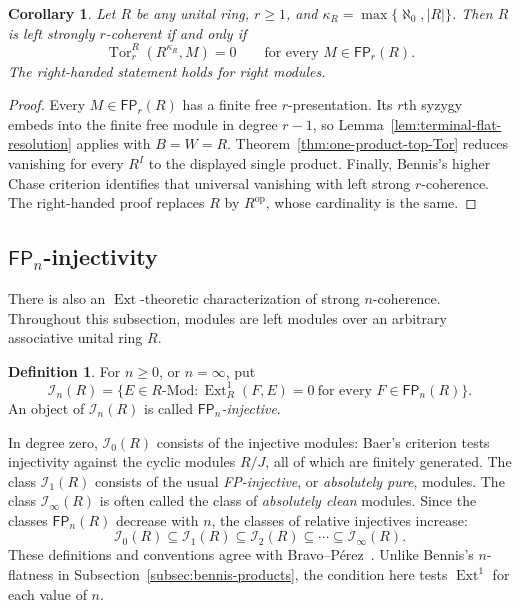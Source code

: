 \documentclass[11pt]{article}
\numberwithin{equation}{section}
\newtheorem{corollary}[theorem]{Corollary}
\theoremstyle{definition}
\newtheorem{definition}[theorem]{Definition}
\theoremstyle{remark}
\newcommand{\Tor}{\operatorname{Tor}}
\newcommand{\Ext}{\operatorname{Ext}}
\newcommand{\FP}{\mathsf{FP}}
\begin{document}
\begin{corollary}
\label{cor:one-product-Chase}
Let $R$ be any unital ring, $r\ge1$, and
$\kappa_R=\max\{\aleph_0,|R|\}$.  Then $R$ is left strongly
$r$-coherent if and only if
\[
\Tor_r^R(R^{\kappa_R},M)=0
\qquad\text{for every }M\in\FP_r(R).
\]
The right-handed statement holds for right modules.
\end{corollary}
\begin{proof}
Every $M\in\FP_r(R)$ has a finite free $r$-presentation.  Its
$r$th syzygy embeds into the finite free module in degree $r-1$, so
Lemma~\ref{lem:terminal-flat-resolution} applies with $B=W=R$.
Theorem~\ref{thm:one-product-top-Tor} reduces vanishing for every
$R^I$ to the displayed single product.  Finally, Bennis's higher Chase
criterion \cite[Theorem~2.6]{Bennis} identifies that universal vanishing
with left strong $r$-coherence.  The right-handed proof replaces $R$ by
$R^{\mathrm{op}}$, whose cardinality is the same.
\end{proof}

\subsection{\texorpdfstring{$\FP_n$}{FPn}-injectivity}\label{subsec:FPinjectivity}

There is also an $\Ext$-theoretic characterization of strong
$n$-coherence.  Throughout this subsection, modules are left modules
over an arbitrary associative unital ring $R$.

\begin{definition}
\label{sc:def:FPninj}
For $n\ge0$, or $n=\infty$, put
\[
\mathcal I_n(R)=\bigl\{E\in R\text{-}\mathrm{Mod}:
  \Ext_R^1(F,E)=0\ \text{for every }F\in\FP_n(R)\bigr\}.
\]
An object of $\mathcal I_n(R)$ is called \emph{$\FP_n$-injective}.
\end{definition}

In degree zero, $\mathcal I_0(R)$ consists of the injective modules:
Baer's criterion tests injectivity against the cyclic modules
$R/J$, all of which are finitely generated.  The class
$\mathcal I_1(R)$ consists of the usual \emph{FP-injective}, or
\emph{absolutely pure}, modules.  The class $\mathcal I_\infty(R)$
is often called the class of \emph{absolutely clean} modules.
Since the classes $\FP_n(R)$ decrease with $n$, the classes of
relative injectives increase:
\[
\mathcal I_0(R)\subseteq\mathcal I_1(R)\subseteq
\mathcal I_2(R)\subseteq\cdots\subseteq\mathcal I_\infty(R).
\]
These definitions and conventions agree with
Bravo--P\'erez~\cite[Definition~3.1]{BravoPerez}.  Unlike Bennis's
$n$-flatness in Subsection~\ref{subsec:bennis-products}, the
condition here tests $\Ext^1$ for each value of $n$.
\end{document}
